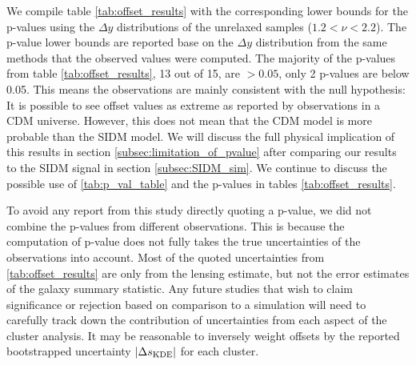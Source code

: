 We compile table \ref{tab:offset_results} with the corresponding lower bounds
for the p-values using
the $\Delta y$ distributions of the unrelaxed samples ($1.2 < \nu < 2.2$). 
The p-value lower bounds are reported base on the $\Delta y$ distribution 
from the same methods that the observed values were computed. 
The majority of the p-values from table \ref{tab:offset_results}, 13 out of 15, are
$ > 0.05$, only 2 p-values are below 0.05. 
This means the observations are mainly consistent with the null hypothesis: 
It is possible to see offset values as extreme as reported by observations
in a CDM universe. 
However, this does not mean that the CDM model is more probable than the SIDM model. 
We will discuss the full physical implication of this results in section  
\ref{subsec:limitation_of_pvalue} after comparing our results to the SIDM signal 
in section \ref{subsec:SIDM_sim}. 
We continue to discuss the possible use of \ref{tab:p_val_table} and
the p-values in tables \ref{tab:offset_results}.

To avoid any report from this study directly quoting a p-value, we did not
combine the p-values from different observations. 
This is because the computation of p-value does not fully
takes the true uncertainties of the observations into account. 
Most of the quoted uncertainties from \ref{tab:offset_results} are only 
from the lensing estimate, but not the error estimates of the galaxy summary 
statistic. 
Any future studies that wish to claim significance or rejection based on
comparison to a simulation will 
need to carefully track down the contribution of uncertainties from each aspect
of the cluster analysis.  
It may be reasonable to inversely weight offsets by the 
reported bootstrapped uncertainty $|\Delta s_{\rm KDE}|$ for each cluster.

